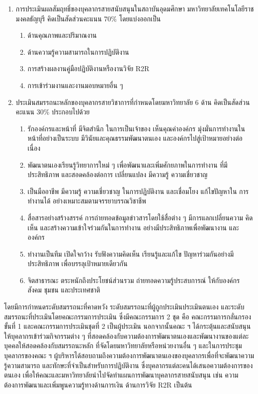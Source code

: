 \begin{enumerate}
\item การประเมินผลสัมฤทธิ์ของบุคลากรสายสนับสนุนในสถาบันอุดมศึกษา มหาวิทยาลัยเทคโนโลยีราชมงคลธัญบุรี คิดเป็นสัดส่วนคะแนน 70\% โดยแบ่งออกเป็น
\begin{enumerate}[label=1.\arabic*,leftmargin=1.2cm]
\item ด้านคุณภาพและปริมาณงาน
\item ด้านความรู้ความสามารถในการปฏิบัติงาน
\item การสร้างผลงานคู่มือปฏิบัติงานหรืองานวิจัย R2R
\item การเข้าร่วมงานและงานมอบหมายอื่น ๆ
\end{enumerate}
\item ประเมินสมรรถนะหลักของบุคลากรสายวิชาการที่กำหนดโดยมหาวิทยาลัย 6 ด้าน คิดเป็นสัดส่วนคะแนน 30\% ประกอบไปด้วย
\begin{enumerate}[label=2.\arabic*,leftmargin=1.2cm]
\item รักองค์กรและหน้าที่ มีจิตสำนึก ในการเป็นเจ้าของ เห็นคุณค่าองค์กร มุ่งมั่นการทำงานใน
หน้าที่อย่างเป็นระบบ มีวินัยและคุณธรรมพัฒนาตนเอง และองค์กรไปสู่เป้าหมายอย่างต่อเนื่อง
\item	พัฒนาตนเองเรียนรู้วิทยาการใหม่ ๆ เพื่อพัฒนาและเพิ่มศักยภาพในการทำงาน ที่มีประสิทธิภาพ
และสอดคล้องต่อการ เปลี่ยนแปลง มีความรู้ ความเชี่ยวชาญ
\item	เป็นมืออาชีพ มีความรู้ ความเชี่ยวชาญ ในการปฏิบัติงาน และเชื่อมโยง แก้ไขปัญหาใน
การทำงานได้ อย่างเหมาะสมตามจรรยาบรรณวิชาชีพ
\item	 สื่อสารอย่างสร้างสรรค์ การถ่ายทอดข้อมูลข่าวสารโดยใช้สื่อต่าง ๆ มีการแลกเปลี่ยนความ
คิดเห็น และสร้างความเข้าใจร่วมกันในการทำงาน อย่างมีประสิทธิภาพเพื่อพัฒนางาน และองค์กร
\item	ทำงานเป็นทีม เปิดใจกว้าง รับฟังความคิดเห็น เรียนรู้และแก้ไข ปัญหาร่วมกันอย่างมี
ประสิทธิภาพ เพื่อบรรลุเป้าหมายเดียวกัน
\item จิตสาธารณะ ตระหนักถึงประโยชน์ส่วนรวม ถ่ายทอดความรู้ประสบการณ์ ให้กับองค์กร สังคม ชุมชน และประเทศชาติ
\end{enumerate}
\end{enumerate}
	
โดยมีการกำหนดระดับสมรรถนะที่คาดหวัง ระดับสมรรถนะที่ผู้ถูกประเมินประเมินตนเอง และระดับสมรรถนะที่ประเมินโดยคณะกรรมการประเมิน ซึ่งมีคณะกรรมการ 2 ชุด คือ คณะกรรมการกลั่นกรองขั้นที่ 1 และคณะกรรมการประเมินชุดที่ 2 เป็นผู้ประเมิน นอกจากนั้นคณะ ฯ ได้กระตุ้นและสนับสนุนให้บุคลากรเข้าร่วมกิจกรรมต่าง ๆ ที่สอดคล้องกับความต้องการพัฒนาตนเองและพัฒนางานของแต่ละบุคคลให้สอดคล้องกับสมรรถนะหลัก ที่จัดโดยมหาวิทยาลัยหรือหน่วยงานอื่น ๆ และในการประชุมบุคลากรของคณะ ฯ ผู้บริหารได้สอบถามถึงความต้องการพัฒนาตนเองของบุคลากรเพื่อที่จะพัฒนาความรู้ความสามารถ และทักษะที่จำเป็นสำหรับการปฏิบัติงาน ซึ่งบุคลากรแต่ละคนได้เสนอความต้องการของตนเอง เพื่อให้คณะและมหาวิทยาลัยนำไปจัดทำแผนการพัฒนาบุคลากรสายสนับสนุน เช่น ความต้องการพัฒนาและเพิ่มพูนความรู้ทางด้านการเงิน ด้านการวิจัย R2R เป็นต้น 

